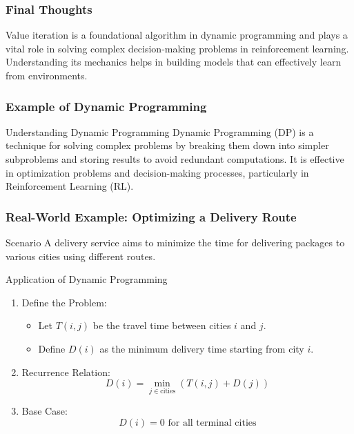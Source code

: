 \documentclass[aspectratio=169]{beamer}
\begin{document}
\begin{frame}[fragile]
    \frametitle{Final Thoughts}
    Value iteration is a foundational algorithm in dynamic programming and plays a vital role in solving complex decision-making problems in reinforcement learning. Understanding its mechanics helps in building models that can effectively learn from environments.
\end{frame}

\begin{frame}
    \frametitle{Example of Dynamic Programming}
    \begin{block}{Understanding Dynamic Programming}
        Dynamic Programming (DP) is a technique for solving complex problems by breaking them down into simpler subproblems and storing results to avoid redundant computations. It is effective in optimization problems and decision-making processes, particularly in Reinforcement Learning (RL).
    \end{block}
\end{frame}

\begin{frame}
    \frametitle{Real-World Example: Optimizing a Delivery Route}
    \begin{block}{Scenario}
        A delivery service aims to minimize the time for delivering packages to various cities using different routes.
    \end{block}

    \begin{block}{Application of Dynamic Programming}
        \begin{enumerate}
            \item Define the Problem:
                \begin{itemize}
                    \item Let $T(i, j)$ be the travel time between cities $i$ and $j$.
                    \item Define $D(i)$ as the minimum delivery time starting from city $i$.
                \end{itemize}
            \item Recurrence Relation:
                \[
                D(i) = \min_{j \in \text{cities}} (T(i, j) + D(j))
                \]
            \item Base Case:
                \[
                D(i) = 0 \text{ for all terminal cities}
                \]
        \end{enumerate}
    \end{block}
\end{frame}
\end{document}
